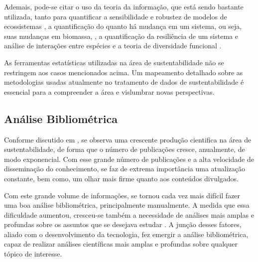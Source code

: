 \documentclass{article}[12pt]
\begin{document}
Ademais, pode-se citar o uso da teoria da informação, que está sendo bastante utilizada, tanto para
quantificar a sensibilidade e robustez de modelos de ecossistemas \cite{Ulanowicz2009}, a
quantificação do quanto há mudança em um sistema, ou seja, suas mudanças em biomassa,
\cite{Boschetti2019}, a quantificação da resiliência de um sistema \cite{Boschetti2019} e análise de
interações entre espécies e a teoria de diversidade funcional \cite{Mouchet2010, Sherwin2019}.

As ferramentas estatísticas utilizadas na área de sustentabilidade não se restringem aos casos
mencionados acima. Um mapeamento detalhado sobre as metodologias usadas atualmente no tratamento de
dados de sustentabilidade é essencial para a compreender a área e vislumbrar novas perspectivas. 


\subsection{Análise Bibliométrica}


Conforme discutido em \cite{Ramakrishna2022}, se observa uma crescente produção cientifica na área
de sustentabilidade, de forma que o número de publicações cresce, anualmente, de modo exponencial.
Com esse grande número de publicações e a alta velocidade de disseminação do conhecimento, se faz de
extrema importância uma atualização constante, bem como, um olhar mais firme quanto aos conteúdos
divulgados.

Com este grande volume de informações, se tornou cada vez mais difícil fazer uma boa análise
bibliométrica, principalmente manualmente. A medida que essa dificuldade aumentou, cresceu-se também
a necessidade de análises mais amplas e profundas sobre os assuntos que se desejava estudar
\cite{Mongeon2016, Huang2017}. A junção desses fatores, aliado com o desenvolvimento da tecnologia,
fez emergir a análise bibliométrica, capaz de realizar análises científicas mais amplas e profundas
sobre qualquer tópico de interesse. \par
\end{document}
